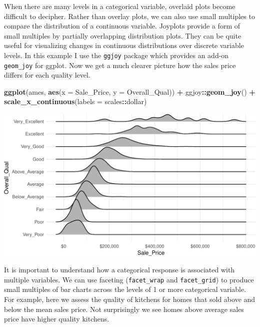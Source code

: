 \documentclass[]{article}
\newenvironment{Shaded}{\begin{snugshade}}{\end{snugshade}}
\newcommand{\KeywordTok}[1]{\textcolor[rgb]{0.13,0.29,0.53}{\textbf{#1}}}
\newcommand{\DataTypeTok}[1]{\textcolor[rgb]{0.13,0.29,0.53}{#1}}
\newcommand{\StringTok}[1]{\textcolor[rgb]{0.31,0.60,0.02}{#1}}
\newcommand{\OperatorTok}[1]{\textcolor[rgb]{0.81,0.36,0.00}{\textbf{#1}}}
\newcommand{\NormalTok}[1]{#1}
\begin{document}
When there are many levels in a categorical variable, overlaid plots
become difficult to decipher. Rather than overlay plots, we can also use
small multiples to compare the distribution of a continuous variable.
Joyplots provide a form of small multiples by partially overlapping
distribution plots. They can be quite useful for visualizing changes in
continuous distributions over discrete variable levels. In this example
I use the \texttt{ggjoy} package which provides an add-on
\texttt{geom\_joy} for ggplot. Now we get a much clearer picture how the
sales price differs for each quality level.

\begin{Shaded}
\begin{Highlighting}[]
\KeywordTok{ggplot}\NormalTok{(ames, }\KeywordTok{aes}\NormalTok{(}\DataTypeTok{x =}\NormalTok{ Sale_Price, }\DataTypeTok{y =}\NormalTok{ Overall_Qual)) }\OperatorTok{+}\StringTok{ }
\StringTok{  }\NormalTok{ggjoy}\OperatorTok{::}\KeywordTok{geom_joy}\NormalTok{() }\OperatorTok{+}
\StringTok{  }\KeywordTok{scale_x_continuous}\NormalTok{(}\DataTypeTok{labels =}\NormalTok{ scales}\OperatorTok{::}\NormalTok{dollar)}
\end{Highlighting}
\end{Shaded}

\begin{center}\includegraphics{Chapter_3_-_Visualization_files/figure-latex/joyplot-1} \end{center}

It is important to understand how a categorical response is associated
with multiple variables. We can use faceting (\texttt{facet\_wrap} and
\texttt{facet\_grid}) to produce small multiples of bar charts across
the levels of 1 or more categorical variable. For example, here we
assess the quality of kitchens for homes that sold above and below the
mean sales price. Not surprisingly we see homes above average sales
price have higher quality kitchens.
\end{document}
